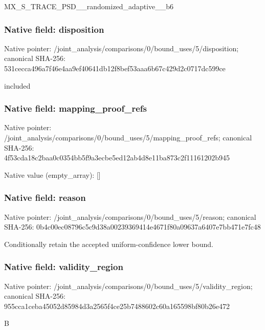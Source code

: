 \documentclass[10pt,a4paper]{article}
\begin{document}
\begingroup\raggedright\sloppy MX\_\allowbreak{}S\_\allowbreak{}TRACE\_\allowbreak{}PSD\_\allowbreak{}\_\allowbreak{}randomized\_\allowbreak{}adaptive\_\allowbreak{}\_\allowbreak{}b6\par\endgroup

\subsubsection{Native field: disposition}
Native pointer: /joint\_\allowbreak{}analysis/comparisons/0/bound\_\allowbreak{}uses/5/disposition; canonical SHA-256: 531cecca496a7f46e4aa9ef40641db12f8bef53aaa6b67c429d2c0717dc599ce

\begingroup\raggedright\sloppy included\par\endgroup

\subsubsection{Native field: mapping\_\allowbreak{}proof\_\allowbreak{}refs}
Native pointer: /joint\_\allowbreak{}analysis/comparisons/0/bound\_\allowbreak{}uses/5/mapping\_\allowbreak{}proof\_\allowbreak{}refs; canonical SHA-256: 4f53cda18c2baa0c0354bb5f9a3ecbe5ed12ab4d8e11ba873c2f11161202b945

Native value (empty\_\allowbreak{}array): []

\subsubsection{Native field: reason}
Native pointer: /joint\_\allowbreak{}analysis/comparisons/0/bound\_\allowbreak{}uses/5/reason; canonical SHA-256: 0b4c00ec08796c5c9d38a00239369414e4671f80a09637a6407e7bb471e7fc48

\begingroup\raggedright\sloppy Conditionally retain the accepted uniform-confidence lower bound.\par\endgroup

\subsubsection{Native field: validity\_\allowbreak{}region}
Native pointer: /joint\_\allowbreak{}analysis/comparisons/0/bound\_\allowbreak{}uses/5/validity\_\allowbreak{}region; canonical SHA-256: 955cca1ceba45052d85984d3a2565f4ce25b7488602c60a165598bf80b26e472

\begingroup\raggedright\sloppy B\par\endgroup
\end{document}
